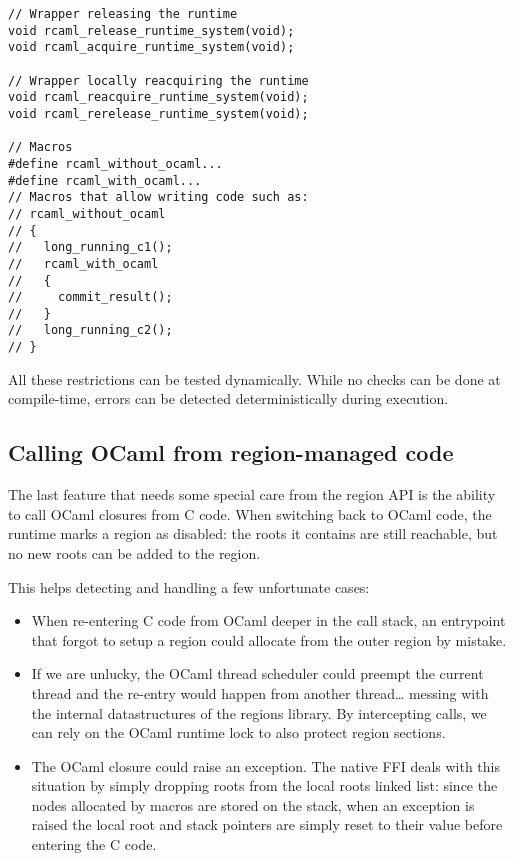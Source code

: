 \documentclass[a4paper]{easychair}
\newcommand{\cpp}[1]{\smash{\lstinline[style=C++]{#1}}}
\begin{document}
\begin{lstlisting}[style=C++]
// Wrapper releasing the runtime
void rcaml_release_runtime_system(void);
void rcaml_acquire_runtime_system(void);

// Wrapper locally reacquiring the runtime
void rcaml_reacquire_runtime_system(void);
void rcaml_rerelease_runtime_system(void);

// Macros
#define rcaml_without_ocaml...
#define rcaml_with_ocaml...
// Macros that allow writing code such as:
// rcaml_without_ocaml
// {
//   long_running_c1();
//   rcaml_with_ocaml
//   {
//     commit_result();
//   }
//   long_running_c2();
// }
\end{lstlisting}

All these restrictions can be tested dynamically. While no checks can be
done at compile-time, errors can be detected deterministically during
execution.

\subsection{Calling OCaml from region-managed code}

The last feature that needs some special care from the region API is the
ability to call OCaml closures from C code. When switching back to OCaml
code, the runtime marks a region as disabled: the roots it contains are
still reachable, but no new roots can be added to the region.

This helps detecting and handling a few unfortunate cases:

\begin{itemize}
\item When re-entering C code from OCaml deeper in the call stack, an
      entrypoint that forgot to setup a region could allocate from the outer
      region by mistake.
\item If we are unlucky, the OCaml thread scheduler could preempt the
      current thread and the re-entry would happen from another
      thread\ldots{} messing with the internal datastructures of the regions
      library. By intercepting calls, we can rely on the OCaml runtime lock
      to also protect region sections.
\item The OCaml closure could raise an exception. The native FFI deals with
      this situation by simply dropping roots from the local roots linked
      list: since the nodes allocated by \cpp{CAMLparam/local} macros are
      stored on the stack, when an exception is raised the local root and
      stack pointers are simply reset to their value before entering the C
      code.
\end{itemize}
\end{document}
